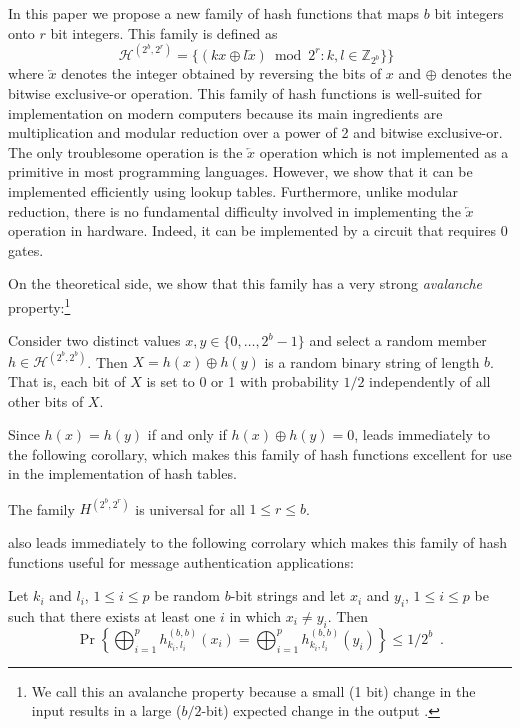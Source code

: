 \documentclass[lotsofwhite,charterfonts]{patmorin}
\newcommand{\Z}{\mathbb{Z}}
\newcommand{\xor}{\oplus}
\newcommand{\rev}[1]{\overleftarrow{#1}}
\begin{document}
In this paper we propose a new family of hash functions that maps $b$ bit
integers onto $r$ bit integers.  This family is defined as
\[
	\mathcal{H}^{(2^b,2^r)} = 
	\{
	  (kx\oplus l\rev{x}) \bmod 2^r : k,l\in \Z_{2^b}\}
	\} \enspace 	
\]
where $\rev{x}$ denotes the integer obtained by reversing the bits of
$x$ and $\xor$ denotes the bitwise exclusive-or operation.
This family of hash functions is well-suited for implementation on
modern computers because its main ingredients are multiplication and
modular reduction over a power of 2 and bitwise exclusive-or.  The
only troublesome operation is the $\rev{x}$ operation which is not
implemented as a primitive in most programming languages.  However,
we show that it can be implemented efficiently using lookup tables.
Furthermore, unlike modular reduction, there is no fundamental
difficulty involved in implementing the $\rev{x}$ operation in
hardware.  Indeed, it can be implemented by a circuit that requires 0
gates.

On the theoretical side, we show that this family has a very strong
\emph{avalanche} property:\footnote{We call this an avalanche property
because a small (1 bit) change in the input results in a large
($b/2$-bit) expected change in the output \cite{X}.}
\begin{thm}
Consider two distinct values  $x,y\in \{0,\ldots,2^b-1\}$ and select a
random member $h\in \mathcal{H}^{(2^b,2^b)}$.  Then
$X = h(x)\xor h(y)$ is a random binary string
of length $b$.  That is, each bit of $X$ is set to 0 or 1 with
probability $1/2$ independently of all other bits of $X$.
\end{thm}

Since $h(x)=h(y)$ if and only if $h(x)\xor h(y)= 0$,  leads
immediately to the following corollary, which makes this family of
hash functions excellent for use in the implementation of hash tables.
\begin{cor}
The family $H^{(2^b,2^r)}$ is universal for all $1\le r\le b$.
\end{cor}

 also leads immediately to the following corrolary
which makes this family of hash functions useful for message
authentication applications:

\begin{cor}
Let $k_i$ and $l_i$, $1\le i\le p$ be random $b$-bit strings and let
$x_i$ and $y_i$, $1\le i\le p$ be such that there exists at least one
$i$ in which $x_i\neq y_i$.  Then
\[
   \Pr\left\{\bigoplus_{i=1}^p h^{(b,b)}_{k_i,l_i}(x_i) = 
	\bigoplus_{i=1}^p h^{(b,b)}_{k_i,l_i}(y_i) \right\} \le 1/2^b
\enspace .
\]
\end{cor}
\end{document}
